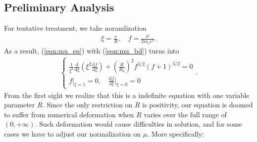 \documentclass[a4paper,11pt]{article}
\newcommand{\mathdd}{\mathrm{d}}
\numberwithin{equation}{section}
\numberwithin{table}{section}
\numberwithin{figure}{section}
\begin{document}
		\subsection{Preliminary Analysis}
			For tentative treatment, we take noramlization
			\begin{align}
				\xi=\frac{r}{R},\quad f=\frac{\mu}{2m_ec^2}.
			\end{align}
			As a result, (\ref{eqn:mu_eq}) with (\ref{eqn:mu_bd}) turns into
			\begin{align}
				\left\{\begin{gathered}
					\frac{1}{\xi^2}\frac{\mathdd}{\mathdd\xi}
						\left(\xi^2\frac{\mathdd f}{\mathdd\xi}\right)
						+\left(\frac{R}{R_0}\right)^2f^{3/2}(f+1)^{3/2}=0 \\
					f\bigg|_{\xi=1}=0,\quad
						\frac{\mathdd f}{\mathdd\xi}\bigg|_{\xi=0}=0
				\end{gathered}\right. .
				\label{eqn:rel_f}
			\end{align}
			From the first sight we realize that this is a indefinite equation with one variable parameter $R$. Since the only restriction on $R$ is positivity, our equation is doomed to suffer from numerical deformation when $R$ varies over the full range of $(0,+\infty)$. Such deformation would cause difficulties in solution, and for some cases we have to adjust our normalization on $\mu$. More specifically: 
\end{document}
